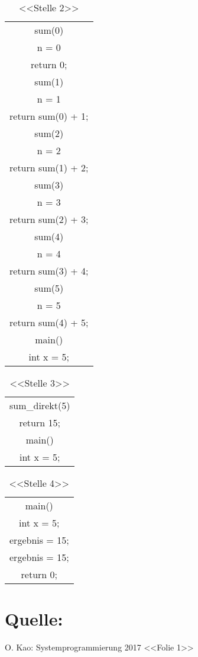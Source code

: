\documentclass[a4paper,12pt]{article}
\begin{document}
\begin{table}
	\begin{center}
		\begin{tabular}{|c|}
			\\ 
			\hline sum(0) \\ n = 0 \\ return 0;\\
			\hline sum(1) \\ n = 1 \\ return sum(0) + 1;\\
			\hline sum(2) \\ n = 2 \\ return sum(1) + 2;\\
			\hline sum(3) \\ n = 3 \\ return sum(2) + 3;\\
			\hline sum(4) \\ n = 4 \\ return sum(3) + 4;\\
			\hline sum(5) \\ n = 5 \\ return sum(4) + 5;\\
			\hline main() \\ int x = 5;\\
			\hline 
		\end{tabular}
	\end{center}
	\caption*{<<Stelle 2>>}
\end{table}

\vspace{\baselineskip}
\vspace{\baselineskip}
\vspace{\baselineskip}
\begin{table}
	\begin{center}
		\begin{tabular}{|c|}
			\\ 
			\hline sum\_direkt(5) \\ return 15;\\
			\hline main() \\ int x = 5;	\\ 
			\hline 
		\end{tabular}
	\end{center}
	\caption*{<<Stelle 3>>}
\end{table}

\vspace{\baselineskip}

\begin{table}
	\begin{center}
		\begin{tabular}{|c|}
			\\ 
			\hline main() \\ int x = 5; \\ ergebnis = 15; \\ ergebnis = 15; \\ return 0;\\
			\hline 
		\end{tabular}
	\end{center}
	\caption*{<<Stelle 4>>}
\end{table}

\clearpage
\section*{Quelle:}

O. Kao: Systemprogrammierung 2017 <<Folie 1>>
  
 
 
 
\end{document}
